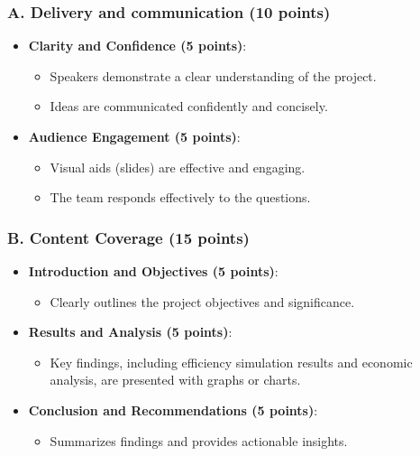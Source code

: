\documentclass[11pt]{article}
\begin{document}
\subsubsection*{A. Delivery and communication (10 points)}
\begin{itemize}
    \item \textbf{Clarity and Confidence (5 points)}:
    \begin{itemize}
        \item Speakers demonstrate a clear understanding of the project.
        \item Ideas are communicated confidently and concisely.
    \end{itemize}
    \item \textbf{Audience Engagement (5 points)}:
    \begin{itemize}
        \item Visual aids (slides) are effective and engaging.
        \item The team responds effectively to the questions.
    \end{itemize}
\end{itemize}

\subsubsection*{B. Content Coverage (15 points)}
\begin{itemize}
    \item \textbf{Introduction and Objectives (5 points)}:
    \begin{itemize}
        \item Clearly outlines the project objectives and significance.
    \end{itemize}
    \item \textbf{Results and Analysis (5 points)}:
    \begin{itemize}
        \item Key findings, including efficiency simulation results and economic analysis, are presented with graphs or charts.
    \end{itemize}
    \item \textbf{Conclusion and Recommendations (5 points)}:
    \begin{itemize}
        \item Summarizes findings and provides actionable insights.
    \end{itemize}
\end{itemize}
\end{document}
